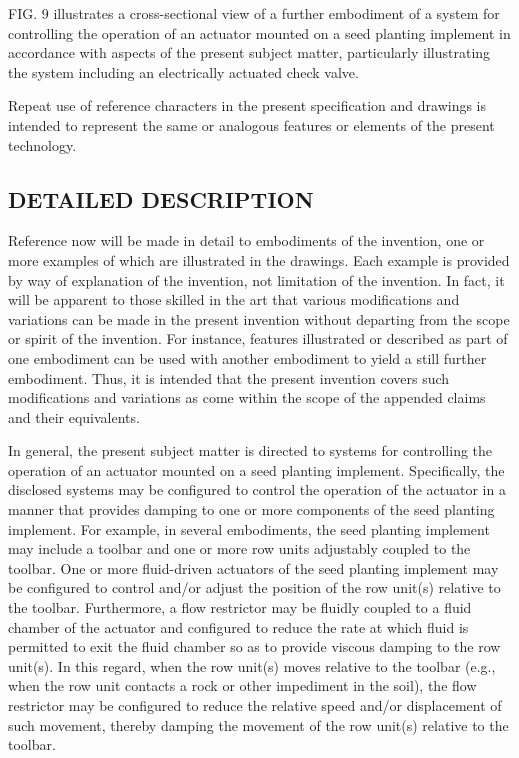 \documentclass[11pt,a4paper]{article}
\begin{document}
FIG. 9 illustrates a cross-sectional view of a further embodiment of a system for controlling the operation of an actuator mounted on a seed planting implement in accordance with aspects of the present subject matter, particularly illustrating the system including an electrically actuated check valve.

Repeat use of reference characters in the present specification and drawings is intended to represent the same or analogous features or elements of the present technology.

\subsection{DETAILED DESCRIPTION}

Reference now will be made in detail to embodiments of the invention, one or more examples of which are illustrated in the drawings. Each example is provided by way of explanation of the invention, not limitation of the invention. In fact, it will be apparent to those skilled in the art that various modifications and variations can be made in the present invention without departing from the scope or spirit of the invention. For instance, features illustrated or described as part of one embodiment can be used with another embodiment to yield a still further embodiment. Thus, it is intended that the present invention covers such modifications and variations as come within the scope of the appended claims and their equivalents.

In general, the present subject matter is directed to systems for controlling the operation of an actuator mounted on a seed planting implement. Specifically, the disclosed systems may be configured to control the operation of the actuator in a manner that provides damping to one or more components of the seed planting implement. For example, in several embodiments, the seed planting implement may include a toolbar and one or more row units adjustably coupled to the toolbar. One or more fluid-driven actuators of the seed planting implement may be configured to control and/or adjust the position of the row unit(s) relative to the toolbar. Furthermore, a flow restrictor may be fluidly coupled to a fluid chamber of the actuator and configured to reduce the rate at which fluid is permitted to exit the fluid chamber so as to provide viscous damping to the row unit(s). In this regard, when the row unit(s) moves relative to the toolbar (e.g., when the row unit contacts a rock or other impediment in the soil), the flow restrictor may be configured to reduce the relative speed and/or displacement of such movement, thereby damping the movement of the row unit(s) relative to the toolbar.
\end{document}
